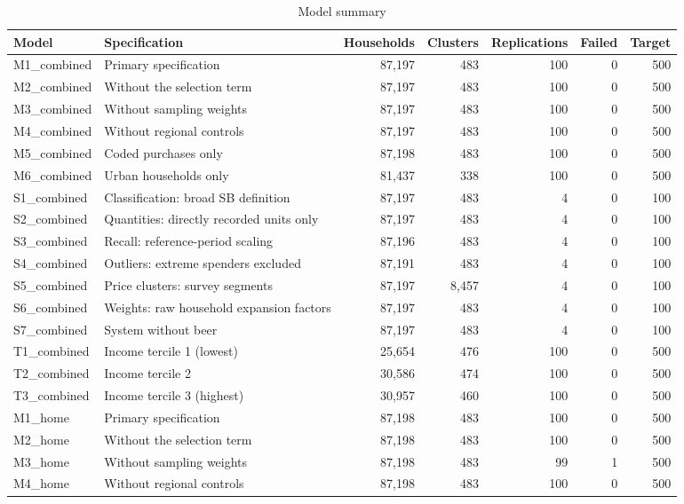 \begin{table}[!htbp]
\centering
\begin{threeparttable}
\caption{Model summary}
\label{tab:models}
\scriptsize
\begin{tabular}{lp{5.2cm}rrrrr}
\toprule
Model & Specification & Households & Clusters & Replications & Failed & Target \\
\midrule
M1\_combined & Primary specification & 87,197 & 483 & 100 & 0 & 500 \\
M2\_combined & Without the selection term & 87,197 & 483 & 100 & 0 & 500 \\
M3\_combined & Without sampling weights & 87,197 & 483 & 100 & 0 & 500 \\
M4\_combined & Without regional controls & 87,197 & 483 & 100 & 0 & 500 \\
M5\_combined & Coded purchases only & 87,198 & 483 & 100 & 0 & 500 \\
M6\_combined & Urban households only & 81,437 & 338 & 100 & 0 & 500 \\
S1\_combined & Classification: broad SB definition & 87,197 & 483 & 4 & 0 & 100 \\
S2\_combined & Quantities: directly recorded units only & 87,197 & 483 & 4 & 0 & 100 \\
S3\_combined & Recall: reference-period scaling & 87,196 & 483 & 4 & 0 & 100 \\
S4\_combined & Outliers: extreme spenders excluded & 87,191 & 483 & 4 & 0 & 100 \\
S5\_combined & Price clusters: survey segments & 87,197 & 8,457 & 4 & 0 & 100 \\
S6\_combined & Weights: raw household expansion factors & 87,197 & 483 & 4 & 0 & 100 \\
S7\_combined & System without beer & 87,197 & 483 & 4 & 0 & 100 \\
T1\_combined & Income tercile 1 (lowest) & 25,654 & 476 & 100 & 0 & 500 \\
T2\_combined & Income tercile 2 & 30,586 & 474 & 100 & 0 & 500 \\
T3\_combined & Income tercile 3 (highest) & 30,957 & 460 & 100 & 0 & 500 \\
M1\_home & Primary specification & 87,198 & 483 & 100 & 0 & 500 \\
M2\_home & Without the selection term & 87,198 & 483 & 100 & 0 & 500 \\
M3\_home & Without sampling weights & 87,198 & 483 & 99 & 1 & 500 \\
M4\_home & Without regional controls & 87,198 & 483 & 100 & 0 & 500 \\

\end{tabular}
\end{threeparttable}
\end{table}
